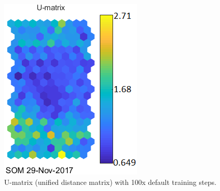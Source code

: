 \documentclass[a4paper,11pt,twocolumn]{article}
\begin{document}
\begin{figure}[htbp]
\begin{minipage}[t]{0.45\linewidth}
  \includegraphics[width=\linewidth]{figures/U-matrix2.png}
  \caption{U-matrix (unified distance matrix) with 100x default training steps.}
  \label{fig:u2}
\end{minipage} 
\end{figure}
\end{document}
